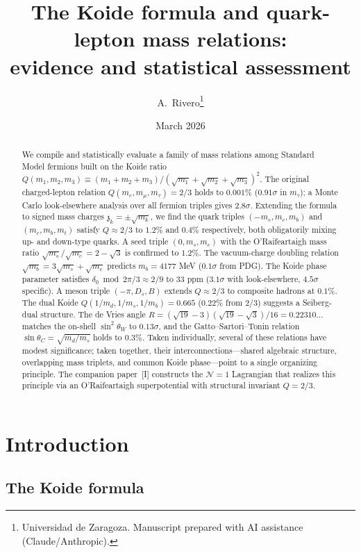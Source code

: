 \documentclass[12pt,a4paper]{article}
\title{The Koide formula and quark-lepton mass relations:\\
evidence and statistical assessment}
\author{A.~Rivero\thanks{Universidad de Zaragoza.
Manuscript prepared with AI assistance (Claude/Anthropic).}}
\date{March 2026}
\newcommand{\zch}{\mathfrak{z}}
\begin{document}
\maketitle

\begin{abstract}
We compile and statistically evaluate a family of mass relations among Standard Model
fermions built on the Koide ratio $Q(m_1,m_2,m_3)\equiv(m_1+m_2+m_3)/(\sqrt{m_1}+\sqrt{m_2}+\sqrt{m_3})^2$.
The original charged-lepton relation $Q(m_e,m_\mu,m_\tau)=2/3$ holds to $0.001\%$
($0.91\sigma$ in $m_\tau$); a Monte Carlo look-elsewhere analysis over all fermion triples
gives $2.8\sigma$.  Extending the formula to signed mass charges
$\zch_k=\pm\sqrt{m_k}$, we find the quark triples
$(-m_s,m_c,m_b)$ and $(m_c,m_b,m_t)$ satisfy $Q\approx 2/3$ to $1.2\%$ and $0.4\%$
respectively, both obligatorily mixing up- and down-type quarks.
A seed triple $(0,m_s,m_c)$ with the O'Raifeartaigh mass ratio
$\sqrt{m_s}/\sqrt{m_c}=2-\sqrt{3}$ is confirmed to $1.2\%$.
The vacuum-charge doubling relation $\sqrt{m_b}=3\sqrt{m_s}+\sqrt{m_c}$ predicts
$m_b=4177$ MeV ($0.1\sigma$ from PDG).
The Koide phase parameter satisfies
$\delta_0\bmod 2\pi/3 \approx 2/9$ to 33 ppm ($3.1\sigma$ with look-elsewhere, $4.5\sigma$ specific).
A meson triple $(-\pi,D_s,B)$ extends $Q\approx 2/3$ to composite hadrons at $0.1\%$.
The dual Koide $Q(1/m_d,1/m_s,1/m_b)=0.665$ ($0.22\%$ from $2/3$) suggests a
Seiberg-dual structure.
The de Vries angle $R=(\sqrt{19}-3)(\sqrt{19}-\sqrt{3})/16=0.22310\ldots$ matches
the on-shell $\sin^2\theta_W$ to $0.13\sigma$,
and the Gatto--Sartori--Tonin relation $\sin\theta_C=\sqrt{m_d/m_s}$ holds to $0.3\%$.
Taken individually, several of these relations have modest significance; taken together,
their interconnections---shared algebraic structure, overlapping mass triplets, and
common Koide phase---point to a single organizing principle.
The companion paper~[I] constructs the $\mathcal{N}=1$ Lagrangian that realizes this
principle via an O'Raifeartaigh superpotential with structural invariant $Q=2/3$.
\end{abstract}

\section{Introduction}

\subsection{The Koide formula}
\end{document}
